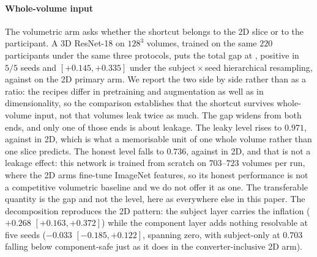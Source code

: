 \documentclass[11pt]{article}
\begin{document}
\paragraph{Whole-volume input}
The volumetric arm asks whether the shortcut belongs to the 2D slice or
to the participant. A 3D ResNet-18 on $128^3$ volumes, trained on the
same $220$ participants under the same three protocols, puts the total
gap at \VolGapTotal{} \VolGapCI{}, positive in $5/5$ seeds and
$[+0.145, +0.335]$ under the subject\,$\times$\,seed hierarchical
resampling, against \AdniGapTotal{} on the 2D primary arm. We report
the two side by side rather than as a ratio: the recipes differ in
pretraining and augmentation as well as in dimensionality, so the
comparison establishes that the shortcut survives whole-volume input,
not that volumes leak twice as much. The
gap widens from both ends, and only one of those ends is about leakage.
The leaky level rises to $0.971$, against \AdniRandomAUROC{} in 2D,
which is what a memorisable unit of one whole volume rather than one
slice predicts. The honest level falls to $0.736$, against
\AdniSafeAUROC{} in 2D, and that is not a leakage effect: this network
is trained from scratch on $703$--$723$ volumes per run, where the 2D
arms fine-tune ImageNet features, so its honest performance is not a competitive
volumetric baseline and we do not offer it as one. The transferable
quantity is the gap and not the level, here as everywhere else in this
paper. The decomposition reproduces the 2D pattern: the subject layer
carries the inflation ($+0.268$ $[+0.163, +0.372]$) while the component
layer adds nothing resolvable at five seeds ($-0.033$
$[-0.185, +0.122]$, spanning zero, with subject-only at $0.703$ falling
below component-safe just as it does in the converter-inclusive 2D arm).
\end{document}
